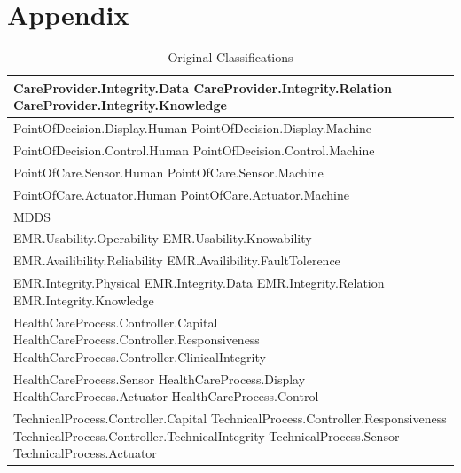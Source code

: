 \documentclass[11pt, notitlepage,abstracton,oneside]{article}   	%
\begin{document}
\section{Appendix}

\begin{table}[htdp]
\caption{Original Classifications}
\label{tab:OriginalClassifications}
\begin{center}
\begin{tabular}{|p{80mm}|}
\hline
CareProvider.Integrity.Data \newline CareProvider.Integrity.Relation \newline CareProvider.Integrity.Knowledge \\ \hline
PointOfDecision.Display.Human \newline PointOfDecision.Display.Machine \\ \hline
PointOfDecision.Control.Human \newline PointOfDecision.Control.Machine \\ \hline
PointOfCare.Sensor.Human \newline PointOfCare.Sensor.Machine \\ \hline
PointOfCare.Actuator.Human \newline PointOfCare.Actuator.Machine \\ \hline
MDDS \\ \hline
EMR.Usability.Operability \newline EMR.Usability.Knowability \\ \hline
EMR.Availibility.Reliability \newline EMR.Availibility.FaultTolerence \\ \hline
EMR.Integrity.Physical \newline EMR.Integrity.Data \newline EMR.Integrity.Relation \newline EMR.Integrity.Knowledge \\ \hline
HealthCareProcess.Controller.Capital \newline HealthCareProcess.Controller.Responsiveness \newline HealthCareProcess.Controller.ClinicalIntegrity \\ \hline
HealthCareProcess.Sensor \newline HealthCareProcess.Display \newline HealthCareProcess.Actuator \newline HealthCareProcess.Control \\ \hline
TechnicalProcess.Controller.Capital \newline TechnicalProcess.Controller.Responsiveness \newline TechnicalProcess.Controller.TechnicalIntegrity \newline TechnicalProcess.Sensor \newline TechnicalProcess.Actuator \\ \hline
\end{tabular}
\end{center}
\label{default}
\end{table}%
\end{document}
